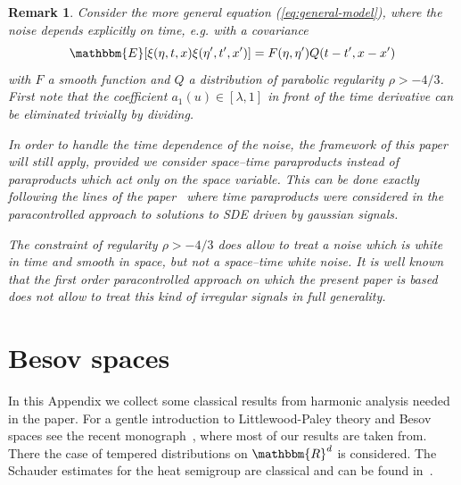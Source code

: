 \documentclass[11pt,reqno]{amsart}
\newtheorem{remark}[theorem]{Remark}
\begin{document}
\begin{remark}
  Consider the more general equation (\ref{eq:general-model}), where the noise
  depends explicitly on time, e.g. with a covariance
  \[ \mathbbm{E} [\xi (\eta, t, x) \xi (\eta', t', x')] = F (\eta, \eta') Q (t
     - t', x - x') \]
  with $F$ a smooth function and $Q$ a distribution of parabolic regularity
  $\rho > - 4 / 3$. First note that the coefficient $a_1 (u) \in [\lambda, 1]$
  in front of the time derivative can be eliminated trivially by dividing.
  
  In order to handle the time dependence of the noise, the framework of this
  paper will still apply, provided we consider space--time paraproducts
  instead of paraproducts which act only on the space variable. This can be
  done exactly following the lines of the
  paper~{\cite{gubinelli_paracontrolled_2015}} where time paraproducts were
  considered in the paracontrolled approach to solutions to SDE driven by
  gaussian signals.
  
  The constraint of regularity $\rho > - 4 / 3$ does allow to treat a noise
  which is white in time and smooth in space, but not a space--time white
  noise. It is well known that the first order paracontrolled approach on
  which the present paper is based does not allow to treat this kind of
  irregular signals in full generality.
\end{remark}

\appendix\section{Besov spaces}\label{appendix:besov}

In this Appendix we collect some classical results from harmonic analysis
needed in the paper. For a gentle introduction to Littlewood-Paley theory and
Besov spaces see the recent monograph~{\cite{bahouri_fourier_2011}}, where
most of our results are taken from. There the case of tempered distributions
on $\mathbbm{R}^d$ is considered. The Schauder estimates for the heat
semigroup are classical and can be found
in~{\cite{gubinelli_paracontrolled_2015,gubinelli_lectures_2015}}.

\
\end{document}
